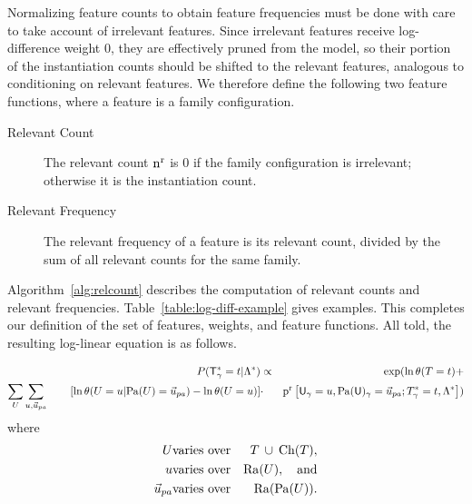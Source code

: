 \documentclass[twoside,11pt]{article}
\begin{document}
Normalizing feature counts to obtain feature frequencies must be done with care to take account of irrelevant features. Since irrelevant features receive log-difference weight 0, they are effectively pruned from the model, so their portion of the instantiation counts should be shifted to the relevant features, analogous to conditioning on relevant features. We therefore define the following two feature functions, where a feature is a family configuration.





\begin{description}
\item[Relevant Count]  The relevant count $\mathrm{n}^{\mathrm{r}}$ is 0 if the family configuration is irrelevant; otherwise it is the instantiation count.
\item[Relevant Frequency] The relevant frequency of a feature is its relevant count, divided by the sum of all relevant counts for the same family.
\end{description}

%

Algorithm~\ref{alg:relcount} describes the computation of relevant counts and relevant frequencies. Table~\ref{table:log-diff-example} gives examples. 
This completes our definition of the set of features, weights, and feature functions. All told, the resulting log-linear equation is as follows.





\begin{definition}\label{def:log-diff-freq-eq}
\begin{eqnarray*}
  \Gprob{\FG{\Ground{\TI}} = \TV} {\QC} &\propto & \exp(\ln \jprob{\TT = \TV} + \\
 \sum_{\UT} \sum_{\UV,\Prange{\UT}}   
\qquad \left[ \ln \cprob{\UT = \UV}{\Pa{\UT} = \Prange{\UT}} - \ln \jprob{\UT = \UV} \right] &
    \cdot &
    \Relfreq{\Appendterm{\Ground{\UI}  = \UV} {\Ground{\Pa{\UI}} = \Prange{\UT}}} {\Qconj})
\end{eqnarray*}
where 
\begin{eqnarray*}
\UT &\mbox{varies over} &  \Setaddterm{\TT} {\Ch{\TT}}, \\
\UV & \mbox{varies over} & \Range{\UT}, \quad\mbox{and}\\
\Prange{\UT} & \mbox{varies over} &  \Range{\Pa{\UT}}.
\end{eqnarray*}
\end{definition}
\end{document}

